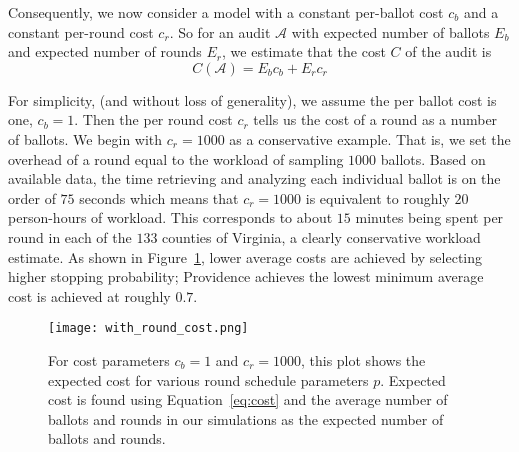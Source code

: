 Consequently, we now consider a model with a constant per-ballot cost $c_b$ and a constant per-round cost $c_r$.
So for an audit $\mathcal{A}$ with expected number of ballots $E_{b}$ and expected number of rounds $E_{r}$, we estimate that the cost $C$ of the audit is
\begin{equation}
C(\mathcal{A}) = E_b c_b + E_r c_r
\label{eq:round_cost}
\end{equation}

For simplicity, (and without loss of generality), we assume the per ballot cost is one, $c_b=1$. Then the per round cost $c_r$ tells us the cost of a round as a number of ballots. We begin with $c_r=1000$ as a conservative example. 
That is, we set the overhead of a round equal to the workload of sampling $1000$ ballots. Based on available data\cite{RI-report}, the time retrieving and analyzing each individual ballot is on the order of $75$ seconds which means that $c_r=1000$ is equivalent to roughly $20$ person-hours of workload. This corresponds to about $15$ minutes being spent per round in each of the $133$ counties of Virginia, a clearly conservative workload estimate. 
As shown in Figure~\ref{fig:with_round_cost}, lower average costs are achieved by selecting higher stopping probability; Providence achieves the lowest minimum average cost is achieved at roughly $0.7$.

\begin{figure}
\texttt{[image: with\_round\_cost.png]}
\caption{For cost parameters $c_b=1$ and $c_r=1000$, this plot shows the expected cost for various round schedule parameters $p$. Expected cost is found using Equation~\ref{eq:cost} and the average number of ballots and rounds in our simulations as the expected number of ballots and rounds.}
\label{fig:with_round_cost}
\end{figure}

